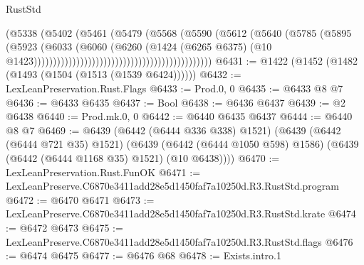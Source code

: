 \begin{lexlean}{RustStd}
\begin{coremodule}
                                                                (@5338
                                                                  (@5402
                                                                    (@5461
                                                                      (@5479
                                                                        (@5568
                                                                          (@5590
                                                                            (@5612
                                                                              (@5640
                                                                                (@5785
                                                                                  (@5895
                                                                                    (@5923
                                                                                      (@6033
                                                                                        (@6060
                                                                                          (@6260
                                                                                            (@1424
                                                                                              (@6265
                                                                                                @6375)
                                                                                              (@10
                                                                                                @1423))))))))))))))))))))))))))))))))))))))))))))))
@6431 := @1422 (@1452 (@1482 (@1493 (@1504 (@1513 (@1539 @6424))))))
@6432 := LexLeanPreservation.Rust.Flags
@6433 := Prod.{0, 0}
@6435 := @6433 @8 @7
@6436 := @6433 @6435
@6437 := Bool
@6438 := @6436 @6437
@6439 := @2 @6438
@6440 := Prod.mk.{0, 0}
@6442 := @6440 @6435 @6437
@6444 := @6440 @8 @7
@6469 := @6439
    (@6442 (@6444 @336 @338) @1521)
    (@6439
      (@6442 (@6444 @721 @35) @1521)
      (@6439 (@6442 (@6444 @1050 @598) @1586) (@6439 (@6442 (@6444 @1168 @35) @1521) (@10 @6438))))
@6470 := LexLeanPreservation.Rust.FunOK
@6471 := LexLeanPreserve.C6870e3411add28e5d1450faf7a10250d.R3.RustStd.program
@6472 := @6470 @6471
@6473 := LexLeanPreserve.C6870e3411add28e5d1450faf7a10250d.R3.RustStd.krate
@6474 := @6472 @6473
@6475 := LexLeanPreserve.C6870e3411add28e5d1450faf7a10250d.R3.RustStd.flags
@6476 := @6474 @6475
@6477 := @6476 @68
@6478 := Exists.intro.{1}

\end{coremodule}
\end{lexlean}
